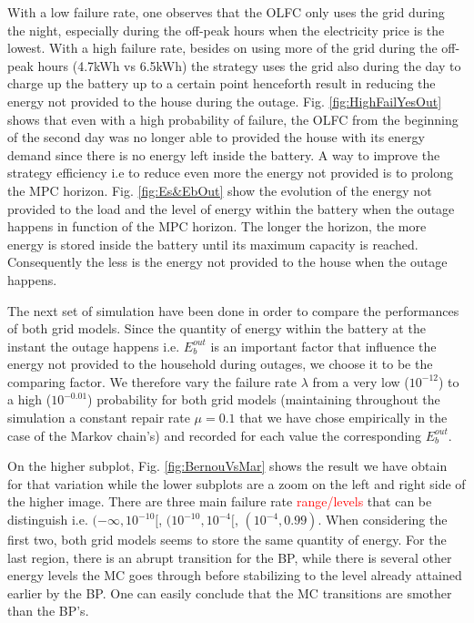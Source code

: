 \documentclass{ifacconf}
\begin{document}
  With a low failure rate, one observes that the OLFC only uses the grid during the night, especially during the off-peak hours when the electricity price is the lowest. With a high failure rate, besides on using  more of the grid during the off-peak hours (4.7kWh vs 6.5kWh) the strategy uses the grid also during the day to charge up the battery up to a certain point henceforth result in reducing the energy not provided to the house during the outage. Fig. \ref{fig:HighFailYesOut} shows that even with a high probability of failure, the OLFC from the beginning of the second day was no longer able to provided the house with its energy demand since there is no energy left inside the battery. A way to improve the strategy efficiency i.e to reduce even more the energy not provided is to prolong the MPC horizon. Fig. \ref{fig:Es&EbOut} show the evolution of the energy not provided to the load and the level of energy within the battery when the outage happens in function of the MPC horizon. The longer the horizon, the more energy is stored inside the battery until its maximum capacity is reached. Consequently the less is the energy not provided to the house when the outage happens.
  
  The next set of simulation have been done in order to compare the performances of both grid models. Since the quantity of energy within the battery at the instant the outage happens i.e. $E_b^{out}$ is an important factor that influence the energy not provided to the household during outages, we choose it to be the comparing factor. We therefore vary the failure rate $\lambda$ from a very low ($10^{-12}$) to a high ($10^{-0.01}$) probability for both grid models (maintaining throughout the simulation a constant repair rate $\mu=0.1$ that we have chose empirically in the case of the Markov chain's) and recorded for each value the corresponding $E_b^{out}$.
  
 On the higher subplot, Fig. \ref{fig:BernouVsMar} shows the result we have obtain for that variation while the lower subplots are a zoom on the left and right side of the higher image. There are three main failure rate \textcolor{red}{range/levels} that can be distinguish i.e. $(-\infty,10^{-10}[$, $(10^{-10},10^{-4}[$, $(10^{-4},0.99)$. When considering the first two, both grid models seems to store the same quantity of energy. For the last region, there is an abrupt transition for the BP, while there is several other energy levels the MC goes through before stabilizing to the level already attained earlier by the BP. One can easily conclude that the MC transitions are smother than the BP's. 
 
\end{document}
